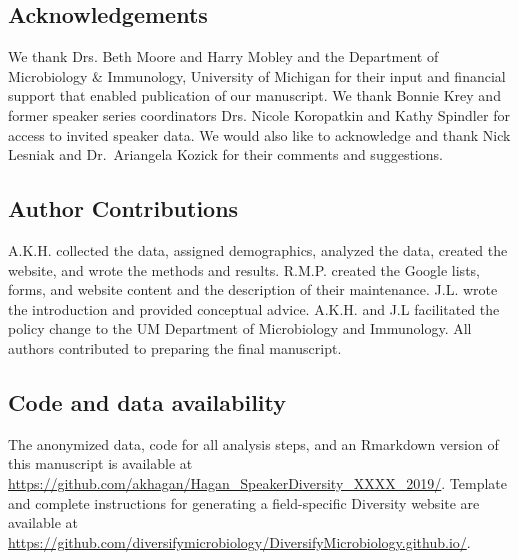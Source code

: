\documentclass[10pt,]{article}
\begin{document}
\subsection{Acknowledgements}\label{acknowledgements}

We thank Drs. Beth Moore and Harry Mobley and the Department of
Microbiology \& Immunology, University of Michigan for their input and
financial support that enabled publication of our manuscript. We thank
Bonnie Krey and former speaker series coordinators Drs. Nicole
Koropatkin and Kathy Spindler for access to invited speaker data. We
would also like to acknowledge and thank Nick Lesniak and Dr.~Ariangela
Kozick for their comments and suggestions.

\subsection{Author Contributions}\label{author-contributions}

A.K.H. collected the data, assigned demographics, analyzed the data,
created the website, and wrote the methods and results. R.M.P. created
the Google lists, forms, and website content and the description of
their maintenance. J.L. wrote the introduction and provided conceptual
advice. A.K.H. and J.L facilitated the policy change to the UM
Department of Microbiology and Immunology. All authors contributed to
preparing the final manuscript.

\subsection{Code and data
availability}\label{code-and-data-availability}

The anonymized data, code for all analysis steps, and an Rmarkdown
version of this manuscript is available at
\url{https://github.com/akhagan/Hagan_SpeakerDiversity_XXXX_2019/}.
Template and complete instructions for generating a field-specific
Diversity website are available at
\url{https://github.com/diversifymicrobiology/DiversifyMicrobiology.github.io/}.

\newpage
\end{document}
